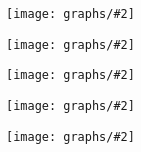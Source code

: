 \documentclass[twoside,12pt]{article}
\begin{document}

\newcommand{\fig}[2]{\begin{minipage}{0.45\textwidth}\centering \texttt{[image: graphs/\#2]} \end{minipage}}
\newcommand{\widefig}[2]{\begin{minipage}{\textwidth}\centering \texttt{[image: graphs/\#2]} \end{minipage}}
\noindent

\widefig{1.4}{mst}

\bigskip

\fig{1.2}{euler1}
\fig{1.2}{euler2}

\bigskip

\fig{.33}{icosian}
\fig{.2}{peterson}

\end{document}
